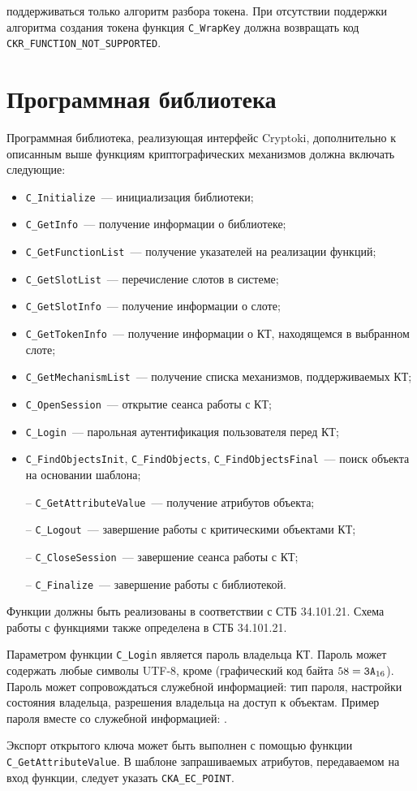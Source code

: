  поддерживаться только алгоритм разбора токена.
При отсутствии поддержки алгоритма создания токена
функция \verb|C_WrapKey| должна возвращать код 
\verb|CKR_FUNCTION_NOT_SUPPORTED|.
%

\section{Программная библиотека}\label{CRYPTOKI.Lib}

Программная библиотека, реализующая интерфейс Cryptoki,
дополнительно к описанным выше функциям криптографических механизмов 
должна включать следующие:
\begin{itemize}
\item
\verb|C_Initialize|~--- инициализация библиотеки;
\item
\verb|C_GetInfo|~--- получение информации о библиотеке;
\item
\verb|C_GetFunctionList|~--- получение указателей на реализации функций;
\item
\verb|C_GetSlotList|~--- перечисление слотов в системе;
\item
\verb|C_GetSlotInfo|~--- получение информации о слоте;
\item
\verb|C_GetTokenInfo|~--- получение информации о КТ, находящемся в 
выбранном слоте;
\item
\verb|C_GetMechanismList|~--- 
получение списка механизмов, поддерживаемых КТ;
\item
\verb|C_OpenSession|~--- открытие сеанса работы с КТ;
\item
\verb|C_Login|~--- парольная аутентификация пользователя перед КТ;
\item
\verb|C_FindObjectsInit|, \verb|C_FindObjects|, 
\verb|C_FindObjectsFinal|~---
поиск объекта на основании шаблона;
\item[--]
\verb|C_GetAttributeValue|~--- получение атрибутов объекта;
\item[--]
\verb|C_Logout|~--- завершение работы с критическими объектами КТ;
\item[--]
\verb|C_CloseSession|~--- завершение сеанса работы с КТ;
\item[--]
\verb|C_Finalize|~--- завершение работы с библиотекой.
\end{itemize}

Функции должны быть реализованы в соответствии с СТБ 34.101.21.
Схема работы с функциями также определена в СТБ 34.101.21.

Параметром функции \verb|C_Login| является пароль владельца КТ.
Пароль может содержать любые символы UTF-8, кроме \str{:} 
(графический код байта $58=\texttt{3A}_{16}$). Пароль может сопровождаться 
служебной информацией: тип пароля, настройки состояния владельца,
разрешения владельца на доступ к объектам. 
%
Пример пароля вместе со служебной информацией: . 

Экспорт открытого ключа может быть выполнен с помощью функции 
\verb|C_GetAttributeValue|. В шаблоне запрашиваемых атрибутов, 
передаваемом на вход функции, следует указать \verb|CKA_EC_POINT|.

